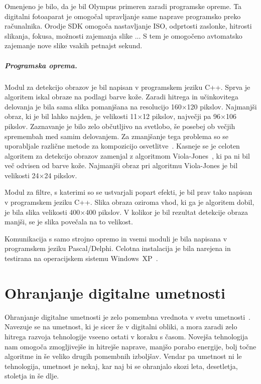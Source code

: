 \documentclass[a4paper, 12pt]{book}
\begin{document}
Omenjeno je bilo, da je bil Olympus primeren zaradi programske opreme. Ta
digitalni fotoaparat je omogočal upravljanje same naprave programsko preko
računalnika. Orodje SDK omogoča nastavljanje ISO, odprtosti zaslonke, hitrosti
slikanja, fokusa, možnosti zajemanja slike ... S tem je omo\-go\-če\-no
avtomatsko zajemanje nove slike vsakih petnajst sekund.

\paragraph{Programska oprema.}
Modul za detekcijo obrazov je bil napisan v programskem jeziku C++. Sprva je
algoritem iskal obraze na podlagi barve kože. Zaradi hitrega in učinkovitega
delovanja je bila sama slika pomanjšana na resolucijo 160$\times$120 pikslov.
Najmanjši obraz, ki je bil lahko najden, je velikosti 11$\times$12 pikslov, največji
pa 96$\times$106 pikslov. Zaznavanje je bilo zelo občutljivo na svetlobo, še
posebej ob večjih spremembah med samim delovanjem. Za zmanjšanje tega problema
so se uporabljale različne metode za kompozicijo
osvetlitve~\cite{kovac2003illumination}. Kasneje se je celoten algoritem za
detekcijo obrazov zamenjal z algoritmom Viola-Jones~\cite{viola2004robust}, ki
pa ni bil več odvisen od barve kože. Najmanjši obraz pri algoritmu Viola-Jones
je bil velikosti 24$\times$24 pikslov.

Modul za filtre, s katerimi so se ustvarjali popart efekti, je bil prav tako
napisan v programskem jeziku C++. Slika obraza oziroma vhod, ki ga je
algoritem dobil, je bila slika velikosti 400$\times$400 pikslov. V kolikor je bil
rezultat detekcije obraza manjši, se je slika povečala na to velikost.

Komunikacija s samo strojno opremo in vsemi moduli je bila napisana v
programskem jeziku Pascal/Delphi. Celotna instalacija je bila narejena in
testirana na operacijskem sistemu Windows~XP~\cite{preservationComputerBasedArt}.


\chapter{Ohranjanje digitalne umetnosti}
\label{ch:ohranjanjeDigitalneUmetnosti}
Ohranjanje digitalne umetnosti je zelo pomembna vrednota v svetu
umetnosti~\cite{ZKM,preservationComputerBasedArt}. Navezuje se na umetnost, ki je sicer že v digitalni
obliki, a mora zaradi zelo hitrega razvoja tehnologije vseeno ostati v koraku
s časom. Novejša tehnologija nam omogoča zmogljivejše in hitrejše naprave, manjšo
porabo energije, bolj točne algoritme in še veliko drugih pomembnih izboljšav.
Vendar pa umetnost ni le tehnologija, umetnost je nekaj, kar naj bi se ohranjalo skozi
leta, desetletja, stoletja in še dlje.
\end{document}
